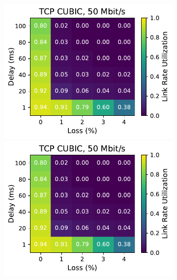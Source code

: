 \begin{figure}[ht]
\begin{subfigure}[b]{1cm}
        \includegraphics[width=\linewidth,trim={8cm 0 0 0},clip]{figures/heatmaps/heatmap_tcp_cubic_50mbps.pdf}
        \vspace*{0.22cm}
        \includegraphics[width=\linewidth,trim={8cm 0 0 0},clip]{figures/heatmaps/heatmap_tcp_cubic_50mbps.pdf}
        \vspace*{0.22cm}

\end{subfigure}
\end{figure}
